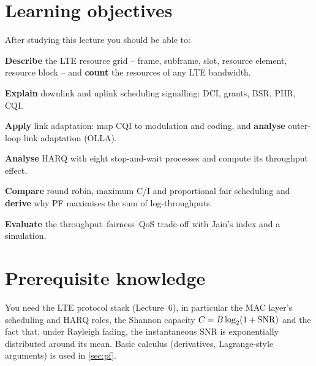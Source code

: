 \documentclass[11pt,a4paper]{article}
\begin{document}
\ACNcover

\section{Learning objectives}
After studying this lecture you should be able to:
\begin{objectives}
  \item \textbf{Describe} the LTE resource grid -- frame, subframe, slot, resource element,
        resource block -- and \textbf{count} the resources of any LTE bandwidth.
  \item \textbf{Explain} downlink and uplink scheduling signalling: DCI, grants, BSR, PHR, CQI.
  \item \textbf{Apply} link adaptation: map CQI to modulation and coding, and \textbf{analyse} outer-loop
        link adaptation (OLLA).
  \item \textbf{Analyse} HARQ with eight stop-and-wait processes and compute its throughput effect.
  \item \textbf{Compare} round robin, maximum C/I and proportional fair scheduling and
        \textbf{derive} why PF maximises the sum of log-throughputs.
  \item \textbf{Evaluate} the throughput--fairness--QoS trade-off with Jain's index and a simulation.
\end{objectives}

\section{Prerequisite knowledge}
You need the LTE protocol stack (Lecture~6), in particular the MAC layer's scheduling and HARQ
roles, the Shannon capacity $C = B\log_2(1+\mathrm{SNR})$ and the fact that, under Rayleigh fading, the
instantaneous SNR is exponentially distributed around its mean. Basic calculus (derivatives,
Lagrange-style arguments) is used in \cref{sec:pf}.
\end{document}

